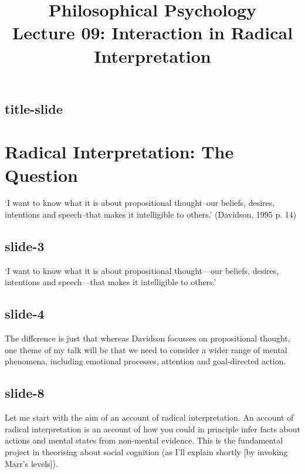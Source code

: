\documentclass[12pt,\papersize]{extarticle}
\begin{document}
\setlength\footnotesep{1em}







\title {Philosophical Psychology \\ Lecture 09: Interaction in Radical Interpretation}



\maketitle

\subsection{title-slide}



\section{Radical Interpretation: The Question}

‘I want to know what it is about propositional thought--our beliefs,
desires, intentions and speech--that makes it intelligible to others.’
(Davidson, 1995 p. 14)

\subsection{slide-3}
‘I want to know what it is about propositional thought---our beliefs, desires, intentions and speech---that makes it intelligible to others.’

\citep[p.~14]{Davidson:1995nl}

\subsection{slide-4}
The difference is just that whereas Davidson focusses on propositional thought,
one theme of my talk will be that we need to consider a wider range of mental phenomena, including
emotional processes, attention and goal-directed action.

\subsection{slide-8}
Let me start with the aim of an account of radical interpretation.
An account of radical interpretation is an account of how you could
in principle infer facts about actions and mental states from
non-mental evidence.
This is the fundamental project in theorising about social cognition
(as I’ll explain shortly [by invoking Marr’s levels]).
\end{document}
